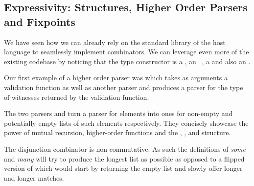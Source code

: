 \subsection{Expressivity: Structures, Higher Order Parsers and Fixpoints}


We have seen how we can already rely on the standard library
of the host language to seamlessly implement combinators.
We can leverage even more of the existing codebase by noticing
that the type constructor  is a ,
an ~\cite{mcbride2008applicative}, a  and also an .



Our first example of a higher order parser was 
which takes as arguments a validation function as well as another
parser and produces a parser for the type of witnesses returned
by the validation function.

The two parsers  and  turn a parser for elements
into ones for non-empty and potentially empty lists of such elements
respectively. They concisely showcase the power of mutual recursion,
higher-order functions and the , ,
and  structure.

\medskip{}

\begin{minipage}{0.45\textwidth}
\end{minipage}
\begin{minipage}{0.45\textwidth}
\end{minipage}

 The disjunction combinator is
non-commutative. As such the definitions of \textit{some} and
\textit{many} will try to produce the longest list as possible
as opposed to a flipped version of  which would start
by returning the empty list and slowly offer longer and longer
matches.


